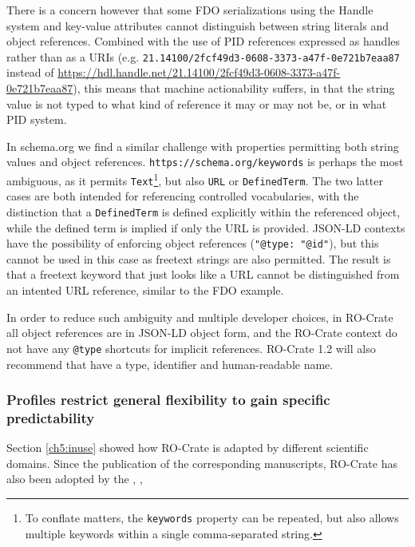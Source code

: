 There is a concern however that some FDO serializations using the Handle system and key-value attributes cannot distinguish between string literals and object references. Combined with the use of PID references expressed as handles rather than as a URIs (e.g. \texttt{21.14100/2fcf49d3-0608-3373-a47f-0e721b7eaa87} instead of \url{https://hdl.handle.net/21.14100/2fcf49d3-0608-3373-a47f-0e721b7eaa87}), this means that machine actionability suffers, in that the string value is not typed to what kind of reference it may or may not be, or in what PID system.

In schema.org we find a similar challenge with properties permitting both string values and object references. \texttt{https://schema.org/keywords} is perhaps the most ambiguous, as it permits \texttt{Text}\footnote{To conflate matters, the \texttt{keywords} property can be repeated, but also allows multiple keywords within a single comma-separated string.}, but also \texttt{URL} or \texttt{DefinedTerm}. The two latter cases are both intended for referencing controlled vocabularies, with the distinction that a \texttt{DefinedTerm} is defined explicitly within the referenced object, while the defined term is implied if only the URL is provided. JSON-LD contexts have the possibility of enforcing object references (\texttt{"@type: "@id"}), but this cannot be used in this case as freetext strings are also permitted. The result is that a freetext keyword that just looks like a URL cannot be distinguished from an intented URL reference, similar to the FDO example.

In order to reduce such ambiguity and multiple developer choices, in RO-Crate all object references are in JSON-LD object form, and the RO-Crate context do not have any \texttt{@type} shortcuts for implicit references. RO-Crate 1.2 will also recommend that  have a type, identifier and human-readable name. 


\subsubsection{Profiles restrict general flexibility to gain specific predictability}

Section \vref{ch5:inuse} showed how RO-Crate is adapted by different scientific domains. Since the publication of the corresponding manuscripts, RO-Crate has also been adopted by the  \cite{LREC2022},  \cite{surveyOntology}, 

